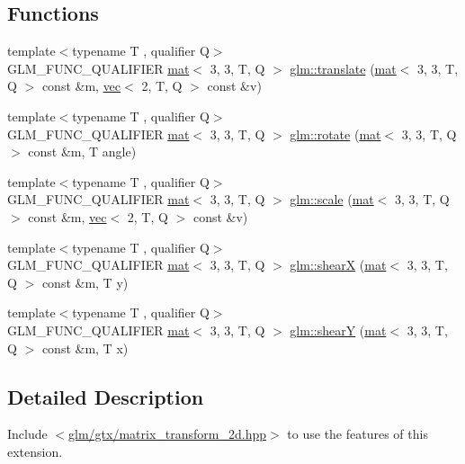 \subsection*{Functions}
\begin{DoxyCompactItemize}
\item 
{\footnotesize template$<$typename T , qualifier Q$>$ }\\G\+L\+M\+\_\+\+F\+U\+N\+C\+\_\+\+Q\+U\+A\+L\+I\+F\+I\+ER \hyperlink{structglm_1_1mat}{mat}$<$ 3, 3, T, Q $>$ \hyperlink{group__gtx__matrix__transform__2d_gaa862e868893cf0b963e1d52e5dfb20c0}{glm\+::translate} (\hyperlink{structglm_1_1mat}{mat}$<$ 3, 3, T, Q $>$ const \&m, \hyperlink{structglm_1_1vec}{vec}$<$ 2, T, Q $>$ const \&v)
\item 
{\footnotesize template$<$typename T , qualifier Q$>$ }\\G\+L\+M\+\_\+\+F\+U\+N\+C\+\_\+\+Q\+U\+A\+L\+I\+F\+I\+ER \hyperlink{structglm_1_1mat}{mat}$<$ 3, 3, T, Q $>$ \hyperlink{group__gtx__matrix__transform__2d_gaddca86444c3dee30a0aa07673d68743d}{glm\+::rotate} (\hyperlink{structglm_1_1mat}{mat}$<$ 3, 3, T, Q $>$ const \&m, T angle)
\item 
{\footnotesize template$<$typename T , qualifier Q$>$ }\\G\+L\+M\+\_\+\+F\+U\+N\+C\+\_\+\+Q\+U\+A\+L\+I\+F\+I\+ER \hyperlink{structglm_1_1mat}{mat}$<$ 3, 3, T, Q $>$ \hyperlink{group__gtx__matrix__transform__2d_ga6fd2493e8271ee595898e9b3d434c1a7}{glm\+::scale} (\hyperlink{structglm_1_1mat}{mat}$<$ 3, 3, T, Q $>$ const \&m, \hyperlink{structglm_1_1vec}{vec}$<$ 2, T, Q $>$ const \&v)
\item 
{\footnotesize template$<$typename T , qualifier Q$>$ }\\G\+L\+M\+\_\+\+F\+U\+N\+C\+\_\+\+Q\+U\+A\+L\+I\+F\+I\+ER \hyperlink{structglm_1_1mat}{mat}$<$ 3, 3, T, Q $>$ \hyperlink{group__gtx__matrix__transform__2d_gab0c6659f6895e2536aed6c893d70aa74}{glm\+::shearX} (\hyperlink{structglm_1_1mat}{mat}$<$ 3, 3, T, Q $>$ const \&m, T y)
\item 
{\footnotesize template$<$typename T , qualifier Q$>$ }\\G\+L\+M\+\_\+\+F\+U\+N\+C\+\_\+\+Q\+U\+A\+L\+I\+F\+I\+ER \hyperlink{structglm_1_1mat}{mat}$<$ 3, 3, T, Q $>$ \hyperlink{group__gtx__matrix__transform__2d_ga2587e46b06a9801aba9ded45cc73445b}{glm\+::shearY} (\hyperlink{structglm_1_1mat}{mat}$<$ 3, 3, T, Q $>$ const \&m, T x)
\end{DoxyCompactItemize}


\subsection{Detailed Description}
Include $<$\hyperlink{matrix__transform__2d_8hpp}{glm/gtx/matrix\+\_\+transform\+\_\+2d.\+hpp}$>$ to use the features of this extension.

